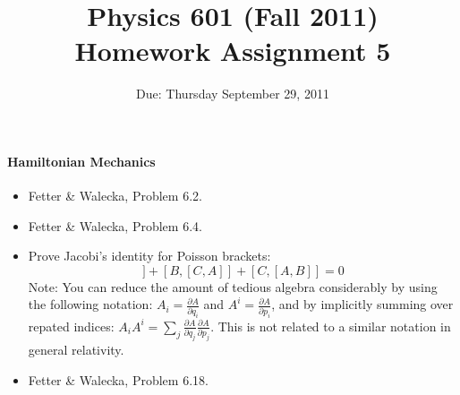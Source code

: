\documentclass[letterpaper,11pt]{article}
\title{Physics 601 (Fall 2011) \\ Homework Assignment 5}
\date{Due: Thursday September 29, 2011}
\begin{document}
\maketitle

\paragraph*{Hamiltonian Mechanics}
\begin{itemize}
 \item Fetter \& Walecka, Problem 6.2.
 \item Fetter \& Walecka, Problem 6.4.
 \item Prove Jacobi's identity for Poisson brackets:
 \begin{equation*}
  [A,[B,C]] + [B,[C,A]] + [C,[A,B]] = 0
 \end{equation*}
 Note: You can reduce the amount of tedious algebra considerably by using the following notation: $A_i = \frac{\partial A}{\partial q_i}$ and $A^i = \frac{\partial A}{\partial p_i}$, and by implicitly summing over repated indices: $A_i A^i = \sum_j \frac{\partial A}{\partial q_j} \frac{\partial A}{\partial p_j}$.  This is not related to a similar notation in general relativity.
 \item Fetter \& Walecka, Problem 6.18.

\end{itemize}
\end{document}
